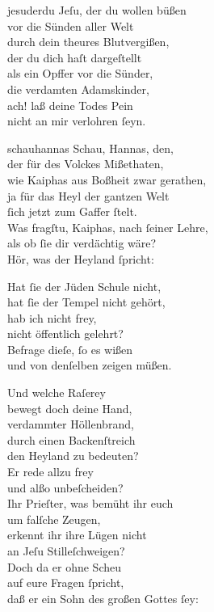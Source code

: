 \documentclass[abbrwidth=6em,tocstyle=ref-genre,shorttitlesize=50]{ees}
\begin{document}
{\begin{movement}{jesuderdu}
  \voice[Coro]
  Jeſu, der du wollen büßen\\
  vor die Sünden aller Welt\\
  durch dein theures Blutvergißen,\\
  der du dich haſt dargeſtellt\\
  als ein Opffer vor die Sünder,\\
  die verdamten Adamskinder,\\
  ach! laß deine Todes Pein\\
  nicht an mir verlohren ſeyn.
\end{movement}

\begin{movement}{schauhannas}
  \voice[Tenore]
  Schau, Hannas, den,\\
  der für des Volckes Mißethaten,\\
  wie Kaiphas aus Boßheit zwar gerathen,\\
  ja für das Heyl der gantzen Welt\\
  ſich jetzt zum Gaffer ſtelt.\\
  Was fragſtu, Kaiphas, nach ſeiner Lehre,\\
  als ob ſie dir verdächtig wäre?\\
  Hör, was der Heyland ſpricht:

  \voice[Basso]
  Hat ſie der Jüden Schule nicht,\\
  hat ſie der Tempel nicht gehört,\\
  hab ich nicht frey,\\
  nicht öffentlich gelehrt?\\
  Befrage dieſe, ſo es wißen\\
  und von denſelben zeigen müßen.

  \voice[Tenore]
  Und welche Raſerey\\
  bewegt doch deine Hand,\\
  verdammter Höllenbrand,\\
  durch einen Backenſtreich\\
  den Heyland zu bedeuten?\\
  Er rede allzu frey\\
  und alßo unbeſcheiden?\\
  Ihr Prieſter, was bemüht ihr euch\\
  um falſche Zeugen,\\
  erkennt ihr ihre Lügen nicht\\
  an Jeſu Stilleſchweigen?\\
  Doch da er ohne Scheu\\
  auf eure Fragen ſpricht,\\
  daß er ein Sohn des großen Gottes ſey:


\end{movement}}
\end{document}
